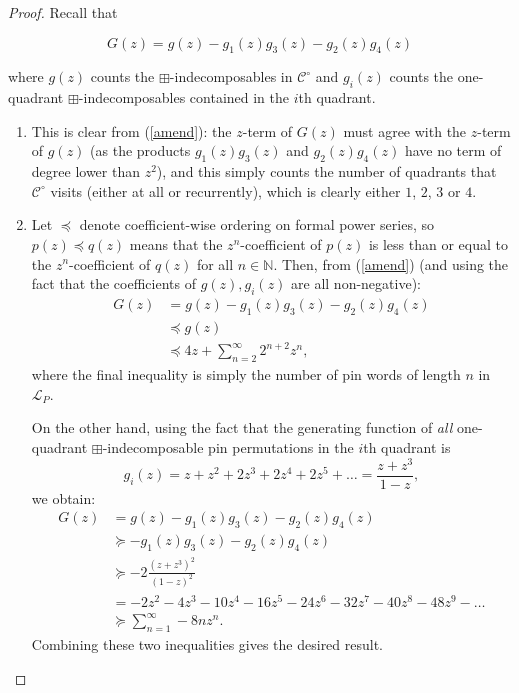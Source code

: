 \documentclass[11pt,a4paper]{article}
\theoremstyle{definition}
\begin{document}
\begin{proof}

Recall that 

\begin{equation} \label{amend}
G(z) = g(z) - g_{1}(z)g_{3}(z) - g_{2}(z)g_{4}(z)
\end{equation}

where $g(z)$ counts the $\boxplus$-indecomposables in $\mathcal{C}^{\circ}$ and $g_{i}(z)$ counts the one-quadrant $\boxplus$-indecomposables contained in the $i$th quadrant.

\begin{enumerate}
\item This is clear from (\ref{amend}): the $z$-term of $G(z)$ must agree with the $z$-term of $g(z)$ (as the products $g_{1}(z)g_{3}(z)$ and $g_{2}(z)g_{4}(z)$ have no term of degree lower than $z^2$), and this simply counts the number of quadrants that $\mathcal{C}^{\circ}$ visits (either at all or recurrently), which is clearly either $1$, $2$, $3$ or $4$.

\item Let $\preceq$ denote coefficient-wise ordering on formal power series, so $p(z) \preceq q(z)$ means that the $z^n$-coefficient of $p(z)$ is less than or equal to the $z^n$-coefficient of $q(z)$ for all $n \in \mathbb{N}$. Then, from (\ref{amend}) (and using the fact that the coefficients of $g(z),g_{i}(z)$ are all non-negative):
\[
\begin{split}
G(z) & = g(z) - g_{1}(z)g_{3}(z) - g_{2}(z)g_{4}(z) \\
 & \preceq g(z) \\
 & \preceq 4z + \sum_{n=2}^{\infty}2^{n+2}z^n,
\end{split}
\]
where the final inequality is simply the number of pin words of length $n$ in $\mathcal{L}_{P}$.

On the other hand, using the fact that the generating function of \emph{all} one-quadrant $\boxplus$-indecomposable pin permutations in the $i$th quadrant is
\[
g_{i}(z) = z + z^2 + 2z^3 + 2z^4 + 2z^5 + \dots = \frac{z + z^3}{1-z},
\]
we obtain:
\[
\begin{split}
G(z) & = g(z) - g_{1}(z)g_{3}(z) - g_{2}(z)g_{4}(z) \\
 & \succeq - g_{1}(z)g_{3}(z) - g_{2}(z)g_{4}(z) \\
 & \succeq -2\frac{(z+z^3)^{2}}{(1-z)^{2}} \\
 & = -2z^2 - 4z^3 - 10z^4 - 16z^5 - 24z^6 - 32z^7 - 40z^8 - 48z^9 - \dots \\
 & \succeq \sum_{n=1}^{\infty}-8nz^n.
\end{split}
\]
Combining these two inequalities gives the desired result.


\end{enumerate}
\end{proof}
\end{document}
